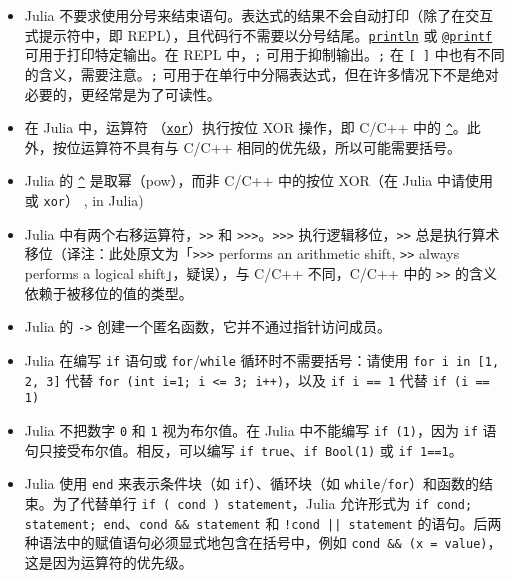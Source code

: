 \begin{itemize}
\item Julia 不要求使用分号来结束语句。表达式的结果不会自动打印（除了在交互式提示符中，即 REPL），且代码行不需要以分号结尾。\hyperlink{783803254548423222}{\texttt{println}} 或 \hyperlink{13954719910189591998}{\texttt{@printf}} 可用于打印特定输出。在 REPL 中，\texttt{;} 可用于抑制输出。\texttt{;} 在 \texttt{[ ]} 中也有不同的含义，需要注意。\texttt{;} 可用于在单行中分隔表达式，但在许多情况下不是绝对必要的，更经常是为了可读性。


\item 在 Julia 中，运算符 \hyperlink{7071880015536674935}{\texttt{\unicodeveebar{}}}（\hyperlink{7071880015536674935}{\texttt{xor}}）执行按位 XOR 操作，即 C/C++ 中的 \hyperlink{462277561264792021}{\texttt{{\textasciicircum}}}。此外，按位运算符不具有与 C/C++ 相同的优先级，所以可能需要括号。


\item Julia 的 \hyperlink{462277561264792021}{\texttt{{\textasciicircum}}} 是取幂（pow），而非 C/C++ 中的按位 XOR（在 Julia 中请使用 \hyperlink{7071880015536674935}{\texttt{\unicodeveebar{}}} 或 \texttt{xor}） \href{@ref}{ }, in Julia)


\item Julia 中有两个右移运算符，\texttt{>>} 和 \texttt{>>>}。\texttt{>>>} 执行逻辑移位，\texttt{>>} 总是执行算术移位（译注：此处原文为「\texttt{>>>} performs an arithmetic shift, \texttt{>>} always performs a logical shift」，疑误），与 C/C++ 不同，C/C++ 中的 \texttt{>>} 的含义依赖于被移位的值的类型。


\item Julia 的 \texttt{->} 创建一个匿名函数，它并不通过指针访问成员。


\item Julia 在编写 \texttt{if} 语句或 \texttt{for}/\texttt{while} 循环时不需要括号：请使用 \texttt{for i in [1, 2, 3]} 代替 \texttt{for (int i=1; i <= 3; i++)}，以及 \texttt{if i == 1} 代替 \texttt{if (i == 1)}


\item Julia 不把数字 \texttt{0} 和 \texttt{1} 视为布尔值。在 Julia 中不能编写 \texttt{if (1)}，因为 \texttt{if} 语句只接受布尔值。相反，可以编写 \texttt{if true}、\texttt{if Bool(1)} 或 \texttt{if 1==1}。


\item Julia 使用 \texttt{end} 来表示条件块（如 \texttt{if}）、循环块（如 \texttt{while}/\texttt{for}）和函数的结束。为了代替单行 \texttt{if ( cond ) statement}，Julia 允许形式为 \texttt{if cond; statement; end}、\texttt{cond \&\& statement} 和 \texttt{!cond || statement} 的语句。后两种语法中的赋值语句必须显式地包含在括号中，例如 \texttt{cond \&\& (x = value)}，这是因为运算符的优先级。



\end{itemize}
